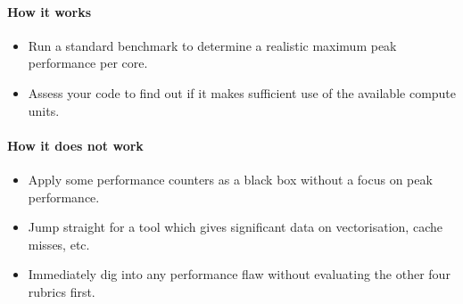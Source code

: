 


\paragraph*{How it works}

\begin{itemize}[noitemsep]
  \item[$\boxplus$] Run a standard benchmark to determine a realistic maximum peak performance per core.
  \item[$\boxplus$] Assess your code to find out if it makes sufficient use of the available compute units.
\end{itemize}


\paragraph*{How it does not work}

\begin{itemize}[noitemsep]
  \item[$\boxminus$] Apply some performance counters as a black box without a focus on  peak performance.
  \item[$\boxminus$] Jump straight for a tool which gives significant data on vectorisation, cache misses, etc.
  \item[$\boxminus$] Immediately dig into any performance flaw without evaluating the other four rubrics first.
\end{itemize}
